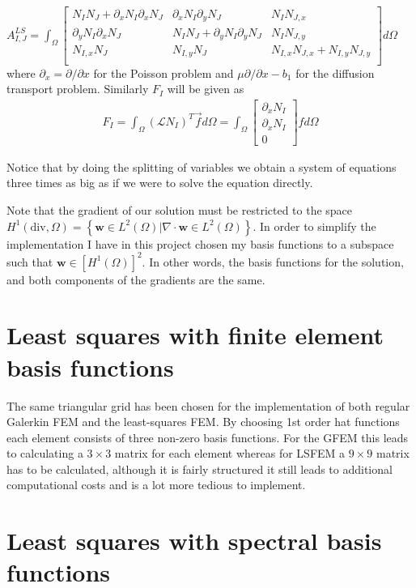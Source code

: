 $
A^{LS}_{I,J} = \int_{\Omega}
\begin{bmatrix}
	N_IN_J + \partial_x N_{I} \partial_xN_{J} & \partial_x N_{I}\partial_y N_{J} & N_IN_{J,x} \\ 	
	\partial_yN_{I}\partial_xN_{J} &N_IN_J + \partial_yN_{I}\partial_yN_{J} &  N_IN_{J,y} \\ 	
	N_{I,x}N_J & N_{I,y}N_J & N_{I,x}N_{J,x} + N_{I,y}N_{J,y} \\ 	
	\label{mat:basicPoisson}
\end{bmatrix}
d\Omega
$
where $\partial_x = \partial / \partial x $ for the Poisson problem and $\mu \partial / \partial x - b_1$ for the diffusion transport problem. Similarly $F_I$ will be given as 
\begin{align}
	F_I = \int_{\Omega}(\mathcal{L}N_I)^T\vec{f} d\Omega = 
	\int_{\Omega}
\begin{bmatrix}
	\partial_xN_I \\
	\partial_xN_I \\
	0
\end{bmatrix}
	f d\Omega
	\label{eq:rhsFunctional}
\end{align}

Notice that by doing the splitting of variables we obtain a system of equations three times as big as if we were to solve the equation directly. 

Note that the gradient of our solution must be restricted to the space $H^1(\text{div},\Omega) = \left\{  \mathbf{w}\in L^2(\Omega) | \nabla \cdot \mathbf{w} \in L^2(\Omega)\right\} $. In order to simplify the implementation I have in this project chosen my basis functions to a subspace such that $\mathbf{w}\in [H^1(\Omega)]^2$. In other words, the basis functions for the solution, and both components of the gradients are the same.  
\section{Least squares with finite element basis functions}
The same triangular grid has been chosen for the implementation of both regular Galerkin FEM and the least-squares FEM. By choosing 1st order hat functions each element consists of three non-zero basis functions. For the GFEM this leads to calculating a $3\times 3$ matrix for each element whereas for LSFEM a $9 \times 9$ matrix has to be calculated, although it is fairly structured it still leads to additional computational costs and is a lot more tedious to implement.
\section{Least squares with spectral basis functions}

